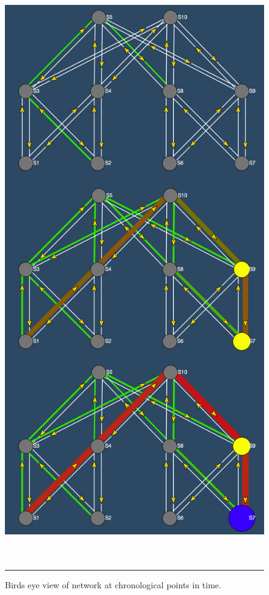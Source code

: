 \begin{figure}[htbp]
	\centering
		\includegraphics[width=20cm,height=25cm,keepaspectratio]{Figures/genview_async.png}
		\rule{35em}{0.5pt}
	\caption[Birds eye view, Asynchronous Incast]{Birds eye view of network at chronological points in time.}
	\label{fig:genview_async}
\end{figure}


